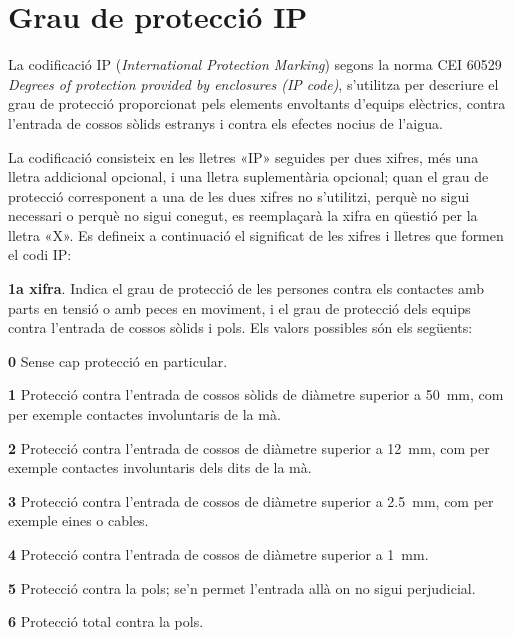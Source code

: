 \section{Grau de protecció IP} \label{sec:grau-IP}  

La codificació IP (\textit{International Protection Marking})  segons la
norma CEI 60529 \textit{Degrees of protection provided by enclosures (IP code)}, s'utilitza per descriure el grau de
protecció  proporcionat pels elements envoltants d'equips elèctrics, contra
l'entrada de cossos sòlids estranys i contra els efectes nocius
de l'aigua.

La codificació consisteix en les lletres «IP»
seguides per dues xifres, més una lletra addicional opcional, i una
lletra suplementària opcional; quan el grau de protecció
corresponent a una de les dues xifres no s'utilitzi, perquè no sigui
necessari o perquè no sigui conegut, es reemplaçarà la xifra en
qüestió per la lletra «X». Es defineix a continuació el
significat de les xifres i lletres que formen el codi IP:

\textbf{1a xifra}. Indica el grau de protecció de les persones contra els contactes amb
parts en tensió o amb peces en moviment, i el grau de protecció dels equips contra l'entrada de cossos sòlids i pols. Els valors possibles són els següents:
\begin{list}{}
   {\setlength{\labelwidth}{10mm} \setlength{\leftmargin}{10mm} \setlength{\labelsep}{2mm}}
   \item[\textbf{0}] Sense cap protecció en particular.
   \item[\textbf{1}] Protecció contra l'entrada de cossos sòlids de diàmetre superior a \qty{50}{mm},
   com per exemple   contactes involuntaris de la mà.
   \item[\textbf{2}] Protecció contra l'entrada de cossos de diàmetre superior a \qty{12}{mm}, com per exemple
   contactes involuntaris dels dits de la mà.
   \item[\textbf{3}] Protecció contra l'entrada de cossos de diàmetre superior a \qty{2,5}{mm},
   com per exemple eines o cables.
   \item[\textbf{4}] Protecció contra l'entrada de cossos de diàmetre superior a \qty{1}{mm}.
   \item[\textbf{5}] Protecció contra la pols; se'n permet l'entrada allà on no sigui perjudicial.
   \item[\textbf{6}] Protecció total contra la pols.
\end{list}

